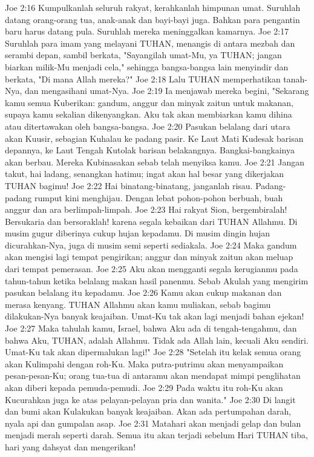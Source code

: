Joe 2:16  Kumpulkanlah seluruh rakyat, kerahkanlah himpunan umat. Suruhlah datang orang-orang tua, anak-anak dan bayi-bayi juga. Bahkan para pengantin baru harus datang pula. Suruhlah mereka meninggalkan kamarnya.
Joe 2:17  Suruhlah para imam yang melayani TUHAN, menangis di antara mezbah dan serambi depan, sambil berkata, "Sayangilah umat-Mu, ya TUHAN; jangan biarkan milik-Mu menjadi cela," sehingga bangsa-bangsa lain menyindir dan berkata, "Di mana Allah mereka?"
Joe 2:18  Lalu TUHAN memperhatikan tanah-Nya, dan mengasihani umat-Nya.
Joe 2:19  Ia menjawab mereka begini, "Sekarang kamu semua Kuberikan: gandum, anggur dan minyak zaitun untuk makanan, supaya kamu sekalian dikenyangkan. Aku tak akan membiarkan kamu dihina atau ditertawakan oleh bangsa-bangsa.
Joe 2:20  Pasukan belalang dari utara akan Kuusir, sebagian Kuhalau ke padang pasir. Ke Laut Mati Kudesak barisan depannya, ke Laut Tengah Kutolak barisan belakangnya. Bangkai-bangkainya akan berbau. Mereka Kubinasakan sebab telah menyiksa kamu.
Joe 2:21  Jangan takut, hai ladang, senangkan hatimu; ingat akan hal besar yang dikerjakan TUHAN bagimu!
Joe 2:22  Hai binatang-binatang, janganlah risau. Padang-padang rumput kini menghijau. Dengan lebat pohon-pohon berbuah, buah anggur dan ara berlimpah-limpah.
Joe 2:23  Hai rakyat Sion, bergembiralah! Bersukaria dan bersoraklah! karena segala kebaikan dari TUHAN Allahmu. Di musim gugur diberinya cukup hujan kepadamu. Di musim dingin hujan dicurahkan-Nya, juga di musim semi seperti sediakala.
Joe 2:24  Maka gandum akan mengisi lagi tempat pengirikan; anggur dan minyak zaitun akan meluap dari tempat pemerasan.
Joe 2:25  Aku akan mengganti segala kerugianmu pada tahun-tahun ketika belalang makan hasil panenmu. Sebab Akulah yang mengirim pasukan belalang itu kepadamu.
Joe 2:26  Kamu akan cukup makanan dan merasa kenyang. TUHAN Allahmu akan kamu muliakan, sebab bagimu dilakukan-Nya banyak keajaiban. Umat-Ku tak akan lagi menjadi bahan ejekan!
Joe 2:27  Maka tahulah kamu, Israel, bahwa Aku ada di tengah-tengahmu, dan bahwa Aku, TUHAN, adalah Allahmu. Tidak ada Allah lain, kecuali Aku sendiri. Umat-Ku tak akan dipermalukan lagi!"
Joe 2:28  "Setelah itu kelak semua orang akan Kulimpahi dengan roh-Ku. Maka putra-putrimu akan menyampaikan pesan-pesan-Ku; orang tua-tua di antaramu akan mendapat mimpi penglihatan akan diberi kepada pemuda-pemudi.
Joe 2:29  Pada waktu itu roh-Ku akan Kucurahkan juga ke atas pelayan-pelayan pria dan wanita."
Joe 2:30  Di langit dan bumi akan Kulakukan banyak keajaiban. Akan ada pertumpahan darah, nyala api dan gumpalan asap.
Joe 2:31  Matahari akan menjadi gelap dan bulan menjadi merah seperti darah. Semua itu akan terjadi sebelum Hari TUHAN tiba, hari yang dahsyat dan mengerikan!
